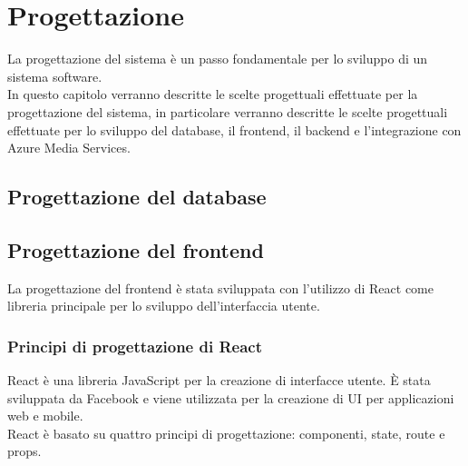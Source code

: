 \chapter{Progettazione}
\label{cap:progettazione}

La progettazione del sistema è un passo fondamentale per lo sviluppo di un sistema software.\\
In questo capitolo verranno descritte le scelte progettuali effettuate per la progettazione del sistema, in particolare verranno descritte le scelte progettuali effettuate per lo sviluppo del database, il frontend, il backend e l'integrazione con Azure Media Services.\\



\section{Progettazione del database}

\section{Progettazione del frontend}
La progettazione del frontend è stata sviluppata con l'utilizzo di React come libreria principale per lo sviluppo dell'interfaccia utente.
\subsection{Principi di progettazione di React}
React è una libreria JavaScript per la creazione di interfacce utente. È stata sviluppata da Facebook e viene utilizzata per la creazione di UI per applicazioni web e mobile.\\
React è basato su quattro principi di progettazione: componenti, state, route e props.\\
